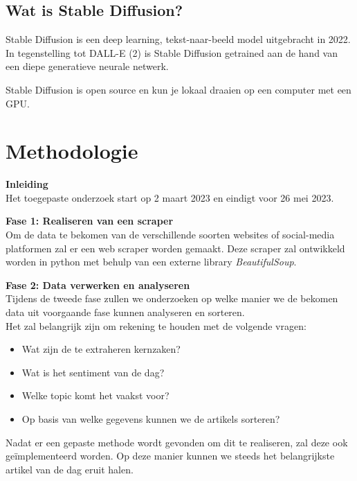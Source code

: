 \subsection{Wat is Stable Diffusion?}
\noindent
Stable Diffusion is een deep learning, tekst-naar-beeld model uitgebracht in 2022. In tegenstelling tot DALL-E (2) is Stable Diffusion getrained aan de hand van een diepe generatieve neurale netwerk.
\autocite{StableDifWikipediaEN}

Stable Diffusion is open source en kun je lokaal draaien op een computer met een GPU.



\section{Methodologie}%
\label{sec:methodologie}
\noindent
\textbf{Inleiding} \\
Het toegepaste onderzoek start op 2 maart 2023 en eindigt voor 26 mei 2023.

\noindent
\textbf{Fase 1: Realiseren van een scraper} \\
Om de data te bekomen van de verschillende soorten websites of social-media platformen zal er een web scraper worden gemaakt. Deze scraper zal ontwikkeld worden in python met behulp van een externe library \emph{BeautifulSoup}.

\noindent
\textbf{Fase 2: Data verwerken en analyseren} \\
Tijdens de tweede fase zullen we onderzoeken op welke manier we de bekomen data uit voorgaande fase kunnen analyseren en sorteren. \\
\noindent
Het zal belangrijk zijn om rekening te houden met de volgende vragen: 
\begin{itemize}
    \item Wat zijn de te extraheren kernzaken?
    \item Wat is het sentiment van de dag? 
    \item Welke topic komt het vaakst voor?
    \item Op basis van welke gegevens kunnen we de artikels sorteren? 
\end{itemize}

\noindent
Nadat er een gepaste methode wordt gevonden om dit te realiseren, zal deze ook geïmplementeerd worden. Op deze manier kunnen we steeds het belangrijkste artikel van de dag eruit halen. \\

